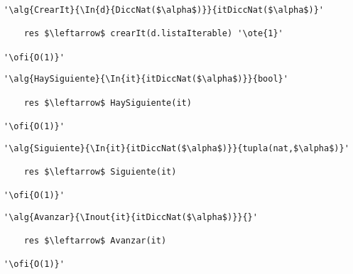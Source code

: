 \begin{lstlisting}[mathescape]
'\alg{CrearIt}{\In{d}{DiccNat($\alpha$)}}{itDiccNat($\alpha$)}'

	res $\leftarrow$ crearIt(d.listaIterable) '\ote{1}'

'\ofi{O(1)}'
\end{lstlisting}

\begin{lstlisting}[mathescape]
'\alg{HaySiguiente}{\In{it}{itDiccNat($\alpha$)}}{bool}'

	res $\leftarrow$ HaySiguiente(it)

'\ofi{O(1)}'
\end{lstlisting}

\begin{lstlisting}[mathescape]
'\alg{Siguiente}{\In{it}{itDiccNat($\alpha$)}}{tupla(nat,$\alpha$)}'

	res $\leftarrow$ Siguiente(it)

'\ofi{O(1)}'
\end{lstlisting}

\begin{lstlisting}[mathescape]
'\alg{Avanzar}{\Inout{it}{itDiccNat($\alpha$)}}{}'

	res $\leftarrow$ Avanzar(it)

'\ofi{O(1)}'
\end{lstlisting}
